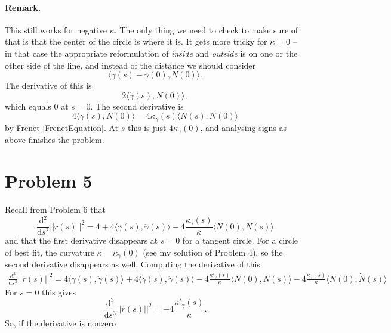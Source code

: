 \paragraph{Remark.} This still works for negative \( \kappa \). The only thing we need to check to make sure of that is that the center of the circle is where it is. It gets more tricky for \(\kappa = 0 \) -- in that case the appropriate reformulation of \emph{inside} and \emph{outside} is on one or the other side of the line, and instead of the distance we should consider
\[
\langle \gamma(s) - \gamma(0), N(0) \rangle.
\]
The derivative of this is
\[
2\langle \dot\gamma(s), N(0) \rangle, 
\]
which equals \(0\) at \(s = 0\). The second derivative is
\[
4\langle \ddot \gamma(s), N(0) \rangle = 4\kappa_\gamma(s) \langle N(s), N(0) \rangle
\]
by Frenet \ref{FrenetEquation}. At \(s\) this is just \( 4\kappa_\gamma(0) \), and analysing signs as above finishes the problem.

\section{Problem 5}

Recall from Problem 6 that
\[
    \frac{\mathrm{d^2}}{\mathrm{d}s^2} \lvert \lvert r(s) \rvert \rvert^2 =  4 + 4\langle \gamma(s), \ddot\gamma(s) \rangle - 4\frac{\kappa_\gamma(s)}{\kappa}\langle N(0), N(s) \rangle
\]
and that the first derivative disappears at \( s = 0 \) for a tangent circle. For a circle of best fit, the curvature \( \kappa = \kappa_\gamma(0) \) (see my solution of Problem 4), so the second derivative disappears as well.
Computing the derivative of this
\begin{align*}
    \frac{\mathrm{d^3}}{\mathrm{d}s^3} \lvert \lvert r(s) \rvert \rvert^2 =  4\langle \gamma(s), \dddot\gamma(s) \rangle + 4\langle \dot\gamma(s), \ddot\gamma(s) \rangle - 4\frac{\kappa'_\gamma(s)}{\kappa}\langle N(0), N(s) \rangle - 4\frac{\kappa_\gamma(s)}{\kappa}\langle N(0), \dot N(s) \rangle
\end{align*}
For \( s = 0 \) this gives
\[
    \frac{\mathrm{d^3}}{\mathrm{d}s^3} \lvert \lvert r(s) \rvert \rvert^2 = -4\frac{\kappa'_\gamma(s)}{\kappa}.
\]
So, if the derivative is nonzero 

